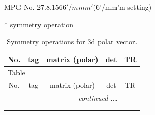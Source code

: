 \documentclass[fleqn,8pt]{jsarticle}
\begin{document}
\setcounter{MaxMatrixCols}{32}

\renewcommand{\tablename}{Table~}
\renewcommand{\figurename}{Figure~}
\begin{center}
\LARGE
MPG No. 27.8.156\quad$6'/mmm'$\quad(6'/mm'm setting)
\end{center}
* symmetry operation
\renewcommand{\arraystretch}{1.3}
\begin{longtable}{ccccc}
\caption{Symmetry operations for 3d polar vector.}
 \\
 \hline \hline
No. & tag & matrix (polar) & det & TR \\ \hline \endfirsthead

\multicolumn{4}{l}{\tablename\ \thetable{}} \\
 \hline \hline
No. & tag & matrix (polar) & det & TR \\ \hline \endhead

 \hline \hline
\multicolumn{4}{r}{\footnotesize\it continued ...} \\ \endfoot

 \hline \hline
\multicolumn{4}{r}{} \\ \endlastfoot


\end{longtable}
\end{document}
